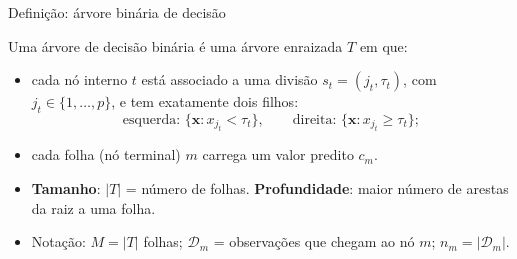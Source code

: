 \documentclass[aspectratio=169]{beamer}
\begin{document}
\begin{frame}{Definição: árvore binária de decisão}
\begin{definition}
Uma \alert{árvore de decisão binária} é uma árvore enraizada $T$ em que:
\begin{itemize}
  \item cada \alert{nó interno} $t$ está associado a uma \alert{divisão} $s_t=(j_t,\tau_t)$, com $j_t\in\{1,\dots,p\}$, e tem exatamente dois filhos:
  \[
  \text{esquerda: } \{\mathbf x: x_{j_t}<\tau_t\},\qquad \text{direita: } \{\mathbf x: x_{j_t}\ge\tau_t\};
  \]
  \item cada \alert{folha} (nó terminal) $m$ carrega um valor predito $c_m$.
\end{itemize}
\end{definition}
\begin{itemize}
  \item \textbf{Tamanho}: $|T|$ = número de folhas. \textbf{Profundidade}: maior número de arestas da raiz a uma folha.
  \item Notação: $M=|T|$ folhas; $\mathcal D_m$ = observações que chegam ao nó $m$; $n_m=|\mathcal D_m|$.
\end{itemize}
\end{frame}
\end{document}
